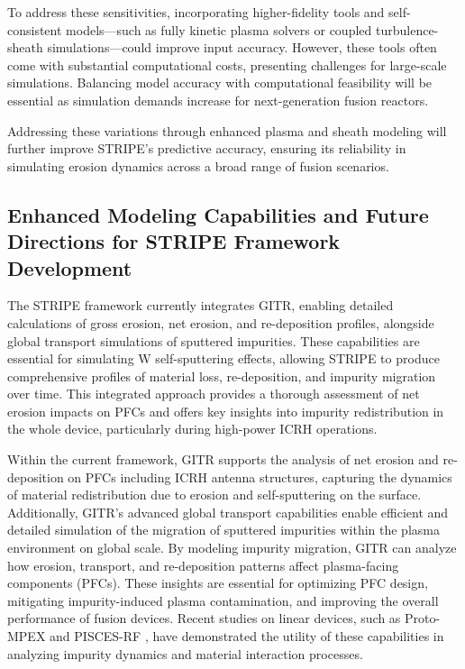 \documentclass[10pt]{iopart}
\begin{document}
To address these sensitivities, incorporating higher-fidelity tools and self-consistent models—such as fully kinetic plasma solvers or coupled turbulence-sheath simulations—could improve input accuracy. However, these tools often come with substantial computational costs, presenting challenges for large-scale simulations. Balancing model accuracy with computational feasibility will be essential as simulation demands increase for next-generation fusion reactors.

Addressing these variations through enhanced plasma and sheath modeling will further improve STRIPE’s predictive accuracy, ensuring its reliability in simulating erosion dynamics across a broad range of fusion scenarios.

\subsection{Enhanced Modeling Capabilities and Future Directions for STRIPE Framework Development}
\label{subssec:75}
The STRIPE framework currently integrates GITR, enabling detailed calculations of gross erosion, net erosion, and re-deposition profiles, alongside global transport simulations of sputtered impurities. These capabilities are essential for simulating W self-sputtering effects, allowing STRIPE to produce comprehensive profiles of material loss, re-deposition, and impurity migration over time. This integrated approach provides a thorough assessment of net erosion impacts on PFCs and offers key insights into impurity redistribution in the whole device, particularly during high-power ICRH operations. 

Within the current framework, GITR supports the analysis of net erosion and re-deposition on PFCs including ICRH antenna structures, capturing the dynamics of material redistribution due to  erosion and self-sputtering on the surface. Additionally, GITR’s advanced global transport capabilities enable efficient and detailed simulation of the migration of sputtered impurities within the plasma environment on global scale.  By modeling impurity migration, GITR can analyze how erosion, transport, and re-deposition patterns affect plasma-facing components (PFCs). These insights are essential for optimizing PFC design, mitigating impurity-induced plasma contamination, and improving the overall performance of fusion devices. Recent studies on linear devices, such as Proto-MPEX \cite{Beers1, Beers2, Rapp:2024} and PISCES-RF \cite{Dhamale:2024}, have demonstrated the utility of these capabilities in analyzing impurity dynamics and material interaction processes.
\end{document}

